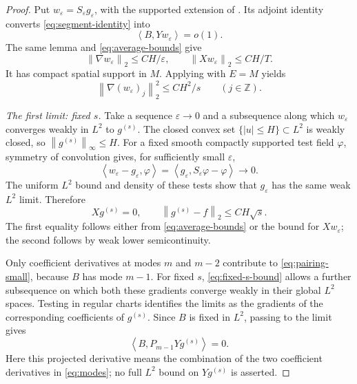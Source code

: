 \documentclass[11pt]{article}
\theoremstyle{remark}
\newcommand{\Z}{\mathbb Z}
\newcommand{\eps}{\varepsilon}
\newcommand{\norm}[1]{\left\lVert#1\right\rVert}
\newcommand{\ip}[2]{\left\langle#1,#2\right\rangle}
\begin{document}
\begin{proof}
Put \(w_\eps=S_\eps g_\eps\), with the supported extension of
. Its adjoint identity converts
\eqref{eq:segment-identity} into
\begin{equation}\label{eq:pairing-small}
 \ip{B}{Yw_\eps}=o(1).
\end{equation}
The same lemma and \eqref{eq:average-bounds} give
\[
 \norm{\nabla w_\eps}_2\le CH/\eps,\qquad
 \norm{Xw_\eps}_2\le CH/T.
\]
It has compact spatial support in \(M\). Applying
 with \(E=M\) yields
\begin{equation}\label{eq:fixed-s-bound}
 \norm{\nabla(w_\eps)_j}_2^2\le CH^2/s\qquad(j\in\Z).
\end{equation}

\medskip\noindent\emph{The first limit: fixed \(s\).}
Take a sequence \(\eps\to0\) and a subsequence along which
\(w_\eps\) converges weakly in \(L^2\) to \(g^{(s)}\).
The closed convex set \(\{|u|\le H\}\subset L^2\) is weakly closed,
so \(\norm{g^{(s)}}_\infty\le H\).
For a fixed smooth compactly supported test field \(\varphi\),
symmetry of convolution gives, for sufficiently small \(\eps\),
\[
 \ip{w_\eps-g_\eps}{\varphi}
       =\ip{g_\eps}{S_\eps\varphi-\varphi}\longrightarrow0.
\]
The uniform \(L^2\) bound and density of these tests show that
\(g_\eps\) has the same weak \(L^2\) limit. Therefore
\begin{equation}\label{eq:limit-function}
 Xg^{(s)}=0,\qquad
 \norm{g^{(s)}-f}_2\le CH\sqrt{s}.
\end{equation}
The first equality follows either from \eqref{eq:average-bounds} or
the bound for \(Xw_\eps\); the second follows by weak lower
semicontinuity.

Only coefficient derivatives at modes \(m\) and \(m-2\) contribute
to \eqref{eq:pairing-small}, because \(B\) has mode \(m-1\).
For fixed \(s\), \eqref{eq:fixed-s-bound} allows a further subsequence
on which both these gradients converge weakly in their global \(L^2\)
spaces. Testing in regular charts identifies the limits as the
gradients of the corresponding coefficients of \(g^{(s)}\).
Since \(B\) is fixed in \(L^2\), passing to the limit gives
\begin{equation}\label{eq:first-limit}
 \ip{B}{P_{m-1}Yg^{(s)}}=0.
\end{equation}
Here this projected derivative means the combination of the two
coefficient derivatives in \eqref{eq:modes}; no full \(L^2\) bound
on \(Yg^{(s)}\) is asserted.


\end{proof}
\end{document}
